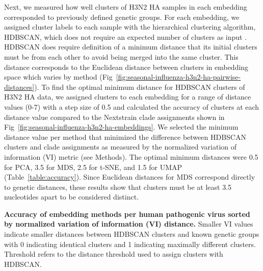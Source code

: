 \documentclass[10pt,letterpaper]{article}
\begin{document}
Next, we measured how well clusters of H3N2 HA samples in each embedding corresponded to previously defined genetic groups.
For each embedding, we assigned cluster labels to each sample with the hierarchical clustering algorithm, HDBSCAN, which does not require an expected number of clusters as input \cite{campello2015hierarchical}.
HDBSCAN does require definition of a minimum distance that its initial clusters must be from each other to avoid being merged into the same cluster.
This distance corresponds to the Euclidean distance between clusters in embedding space which varies by method (Fig~\ref{fig:seasonal-influenza-h3n2-ha-pairwise-distances}).
To find the optimal minimum distance for HDBSCAN clusters of H3N2 HA data, we assigned clusters to each embedding for a range of distance values (0-7) with a step size of 0.5 and calculated the accuracy of clusters at each distance value compared to the Nextstrain clade assignments shown in Fig~\ref{fig:seasonal-influenza-h3n2-ha-embeddings}.
We selected the minimum distance value per method that minimized the difference between HDBSCAN clusters and clade assignments as measured by the normalized variation of information (VI) metric \cite{meilua2003comparing} (see Methods).
The optimal minimum distances were 0.5 for PCA, 3.5 for MDS, 2.5 for t-SNE, and 1.5 for UMAP (Table~\ref{table:accuracy}).
Since Euclidean distances for MDS correspond directly to genetic distances, these results show that clusters must be at least 3.5 nucleotides apart to be considered distinct.

\begin{table}[!ht]
\centering
\caption{
  {\bf Accuracy of embedding methods per human pathogenic virus sorted by normalized variation of information (VI) distance.}
  Smaller VI values indicate smaller distances between HDBSCAN clusters and known genetic groups with 0 indicating identical clusters and 1 indicating maximally different clusters.
  Threshold refers to the distance threshold used to assign clusters with HDBSCAN.}

\label{table:accuracy}
\end{table}
\end{document}

